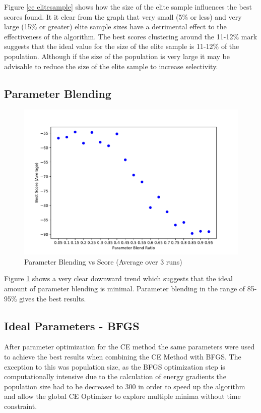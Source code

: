 \documentclass[conference,letterpaper]{IEEEtran}
\begin{document}
\par Figure \ref{ce elitesample} shows how the size of the elite sample influences the best scores found. It it clear from the graph that very small (5\% or less) and very large (15\% or greater) elite sample sizes have a detrimental effect to the effectiveness of the algorithm. The best scores clustering around the 11-12\% mark suggests that the ideal value for the size of the elite sample is 11-12\% of the population. Although if the size of the population is very large it may be advisable to reduce the size of the elite sample to increase selectivity. 

\subsection{Parameter Blending}
\begin{figure}[H]
    \includegraphics[scale=0.43]{CE_blending}
    \caption{Parameter Blending vs Score (Average over 3 runs)}
    \label{ce blending}
\end{figure}
\par Figure \ref{ce blending} shows a very clear downward trend which suggests that the ideal amount of parameter blending is minimal. Parameter blending in the range of 85-95\% gives the best results.

\subsection{Ideal Parameters - BFGS}
\par After parameter optimization for the CE method the same parameters were used to achieve the best results when combining the CE Method with BFGS. The exception to this was population size, as the BFGS optimization step is computationally intensive due to the calculation of energy gradients the population size had to be decreased to 300 in order to speed up the algorithm and allow the global CE Optimizer to explore multiple minima without time constraint.
\end{document}
